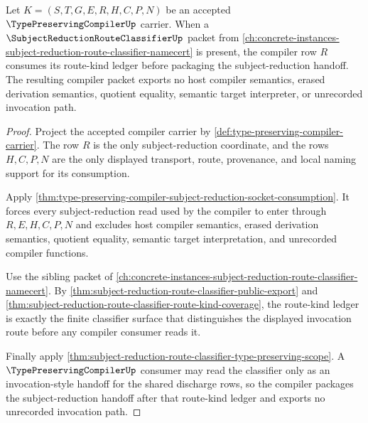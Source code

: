 \begin{theorem}
\label{thm:type-preserving-compiler-route-classifier-sibling-dependency}
Let $K=(S,T,G,E,R,H,C,P,N)$ be an accepted $\TypePreservingCompilerUp$ carrier. When a $\SubjectReductionRouteClassifierUp$ packet from \autoref{ch:concrete-instances-subject-reduction-route-classifier-namecert} is present, the compiler row $R$ consumes its route-kind ledger before packaging the subject-reduction handoff. The resulting compiler packet exports no host compiler semantics, erased derivation semantics, quotient equality, semantic target interpreter, or unrecorded invocation path.
\end{theorem}
\begin{proof}
Project the accepted compiler carrier by \autoref{def:type-preserving-compiler-carrier}. The row $R$ is the only subject-reduction coordinate, and the rows $H,C,P,N$ are the only displayed transport, route, provenance, and local naming support for its consumption.

Apply \autoref{thm:type-preserving-compiler-subject-reduction-socket-consumption}. It forces every subject-reduction read used by the compiler to enter through $R,E,H,C,P,N$ and excludes host compiler semantics, erased derivation semantics, quotient equality, semantic target interpretation, and unrecorded compiler functions.

Use the sibling packet of \autoref{ch:concrete-instances-subject-reduction-route-classifier-namecert}. By \autoref{thm:subject-reduction-route-classifier-public-export} and \autoref{thm:subject-reduction-route-classifier-route-kind-coverage}, the route-kind ledger is exactly the finite classifier surface that distinguishes the displayed invocation route before any compiler consumer reads it.

Finally apply \autoref{thm:subject-reduction-route-classifier-type-preserving-scope}. A $\TypePreservingCompilerUp$ consumer may read the classifier only as an invocation-style handoff for the shared discharge rows, so the compiler packages the subject-reduction handoff after that route-kind ledger and exports no unrecorded invocation path.
\end{proof}
